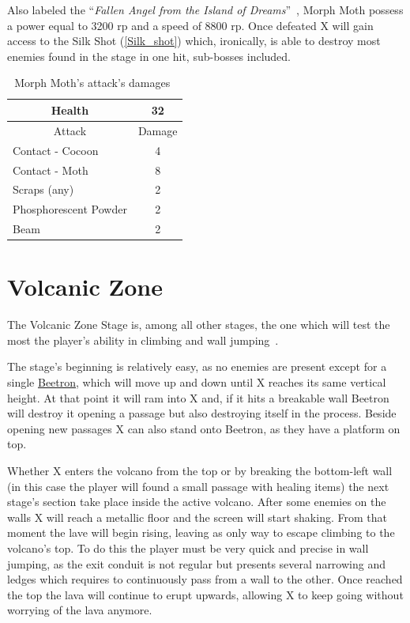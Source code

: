 Also labeled the ``\textit{Fallen Angel from the Island of Dreams}''~\cite{book:MMX_Complete_art}, Morph Moth possess a power equal to 3200 rp and a speed of 8800 rp. Once defeated X will gain access to the Silk Shot (\ref{Silk_shot}) which, ironically, is able to destroy most enemies found in the stage in one hit, sub-bosses included.


\begin{table}[htp]
	\centering
	\begin{tabular}[h]{l c}
		
		\toprule
		\multicolumn{1}{c}{Health}  & 32 \\
		\midrule
		\multicolumn{1}{c}{Attack} & \multicolumn{1}{c}{Damage}\\
		Contact - Cocoon & 4 \\
		Contact - Moth& 8\\
		Scraps (any) & 2\\
		Phosphorescent Powder& 2\\
		Beam & 2\\
		\bottomrule
	\end{tabular}
	\caption{Morph Moth's attack's damages~\cite{wiki:Morph_moth}}
\end{table}

\section{Volcanic Zone}
The Volcanic Zone Stage is, among all other stages, the one which will test the most the player's ability in climbing and wall jumping~\cite{stratwiki:Volcanic_zone}. 

The stage's beginning is relatively easy, as no enemies are present except for a single \hyperlink{enem:Beetron}{Beetron}, which will move up and down until X reaches its same vertical height. At that point it will ram into X and, if it hits a breakable wall Beetron will destroy it opening a passage but also destroying itself in the process. Beside opening new passages X can also stand onto Beetron, as they have a platform on top.

Whether X enters the volcano from the top or by breaking the bottom-left wall (in this case the player will found a small passage with healing items) the next stage's section take place inside the active volcano. After some enemies on the walls X will reach a metallic floor and the screen will start shaking. From that moment the lave will begin rising, leaving as only way to escape climbing to the volcano's top. To do this the player must be very quick and precise in wall jumping, as the exit conduit is not regular but presents several narrowing and ledges which requires to continuously pass from a wall to the other. Once reached the top the lava will continue to erupt upwards, allowing X to keep going without worrying of the lava anymore.

